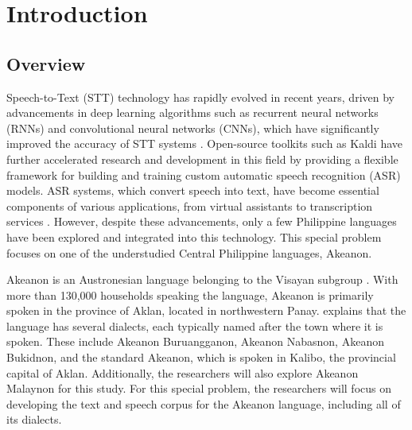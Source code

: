\chapter{Introduction}
\label{sec:researchdesc}    %

\section{Overview}
\label{sec:overview}

Speech-to-Text (STT) technology has rapidly evolved in recent years, driven by advancements in deep learning algorithms such as recurrent neural networks (RNNs) and convolutional neural networks (CNNs), which have significantly improved the accuracy of STT systems \cite{Televic:2024}. Open-source toolkits such as Kaldi have further accelerated research and development in this field by providing a flexible framework for building and training custom automatic speech recognition (ASR) models. ASR systems, which convert speech into text, have become essential components of various applications, from virtual assistants to transcription services . However, despite these advancements, only a few Philippine languages have been explored and integrated into this technology. This special problem focuses on one of the understudied \cite{Wellstood:2022} Central Philippine languages, Akeanon. 

Akeanon is an Austronesian language belonging to the Visayan subgroup \cite{Biray:2023}. With more than 130,000 households \cite{PSA:2023} speaking the language, Akeanon is primarily spoken in the province of Aklan, located in northwestern Panay.  explains that the language has several dialects, each typically named after the town where it is spoken. These include Akeanon Buruangganon, Akeanon Nabasnon, Akeanon Bukidnon, and the standard Akeanon, which is spoken in Kalibo, the provincial capital of Aklan. Additionally, the researchers will also explore Akeanon Malaynon for this study. For this special problem, the researchers will focus on developing the text and speech corpus for the Akeanon language, including all of its dialects.


